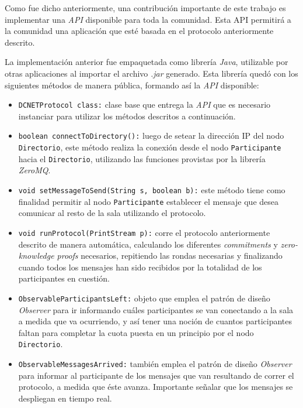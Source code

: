 {Como fue dicho anteriormente, una contribución importante de este trabajo 
es implementar una \emph{API} disponible para toda la comunidad. Esta API 
permitirá a la comunidad una aplicación que esté basada en el protocolo 
anteriormente descrito. 

La implementación anterior fue empaquetada como librería \emph{Java}, 
utilizable por otras aplicaciones al importar el archivo \emph{.jar} generado. 
Esta librería quedó con los siguientes métodos de manera pública, formando así 
la \emph{API} disponible:

\begin{itemize}
    \item \texttt{DCNETProtocol class:} clase base que entrega la \emph{API} 
    que es necesario instanciar para utilizar los métodos descritos a 
    continuación. 
    \item \texttt{boolean connectToDirectory():} luego de setear la dirección 
    IP del nodo \texttt{Directorio}, este método realiza la conexión desde el 
    nodo \texttt{Participante} hacia el \texttt{Directorio}, utilizando las funciones 
    provistas por la librería \emph{ZeroMQ}.
    \item \texttt{void setMessageToSend(String s, boolean b):} este método 
    tiene como finalidad permitir al nodo \texttt{Participante} establecer el mensaje 
    que desea comunicar al resto de la sala utilizando el protocolo. 
    \item \texttt{void runProtocol(PrintStream p):} corre el protocolo 
    anteriormente descrito de manera automática, calculando los diferentes 
    \emph{commitments} y \emph{zero-knowledge proofs} necesarios, repitiendo 
    las rondas necesarias y finalizando cuando todos los mensajes han sido 
    recibidos por la totalidad de los participantes en cuestión.
    \item \texttt{ObservableParticipantsLeft:} objeto que emplea el patrón de 
    diseño \emph{Observer} para ir informando cuáles participantes se van 
    conectando a la sala a medida que va ocurriendo, y así tener una noción de 
    cuantos participantes faltan para completar la cuota puesta en un 
    principio por el nodo \texttt{Directorio}.
    \item \texttt{ObservableMessagesArrived:} también emplea el patrón de 
    diseño \emph{Observer} para informar al participante de los mensajes que 
    van resultando de correr el protocolo, a medida que éste avanza. 
    Importante señalar que los mensajes se despliegan en tiempo real.
\end{itemize}

}
